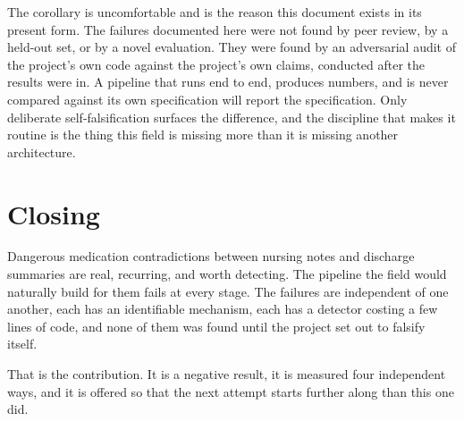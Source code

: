 The corollary is uncomfortable and is the reason this document exists in its
present form. The failures documented here were not found by peer review, by a
held-out set, or by a novel evaluation. They were found by an adversarial audit
of the project's own code against the project's own claims, conducted after the
results were in. A pipeline that runs end to end, produces numbers, and is never
compared against its own specification will report the specification. Only
deliberate self-falsification surfaces the difference, and the discipline that
makes it routine is the thing this field is missing more than it is missing
another architecture.

\section{Closing}
\label{sec:conc-closing}

Dangerous medication contradictions between nursing notes and discharge
summaries are real, recurring, and worth detecting. The pipeline the field would
naturally build for them fails at every stage. The failures are independent of
one another, each has an identifiable mechanism, each has a detector costing a
few lines of code, and none of them was found until the project set out to
falsify itself.

That is the contribution. It is a negative result, it is measured four
independent ways, and it is offered so that the next attempt starts further
along than this one did.
